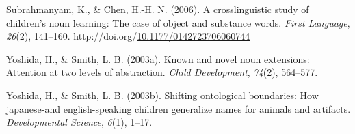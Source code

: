 \documentclass[10pt, letterpaper]{article}
\newenvironment{CSLReferences}%
  {}%
  {\par}
\begin{document}
\begin{CSLReferences}{1}{0}
\leavevmode{}%
Subrahmanyam, K., \& Chen, H.-H. N. (2006). A crosslinguistic study of
children's noun learning: {The} case of object and substance words.
\emph{First Language}, \emph{26}(2), 141--160.
http://doi.org/\href{https://doi.org/10.1177/0142723706060744}{10.1177/0142723706060744}

\leavevmode{}%
Yoshida, H., \& Smith, L. B. (2003a). Known and novel noun extensions:
Attention at two levels of abstraction. \emph{Child Development},
\emph{74}(2), 564--577.

\leavevmode{}%
Yoshida, H., \& Smith, L. B. (2003b). Shifting ontological boundaries:
How japanese-and english-speaking children generalize names for animals
and artifacts. \emph{Developmental Science}, \emph{6}(1), 1--17.

\end{CSLReferences}


\end{document}
